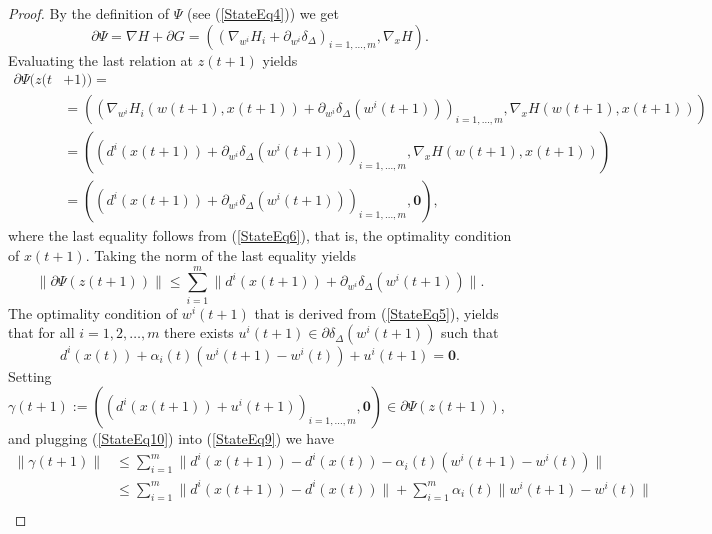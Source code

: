 \documentclass[11pt]{article}
\numberwithin{equation}{section}
\begin{document}
\begin{proof}
By the definition of $\Psi$ (see (\ref{StateEq4})) we get
\begin{equation*}
	\partial \Psi = \nabla H + \partial G  
= \left( \left( \nabla_{w^i} H_i + \partial_{w^i} \delta_{\Delta} \right)_{i=1, \ldots ,m} , \nabla_x H \right) .
\end{equation*}
Evaluating the last relation at $z(t+1)$ yields
\begin{equation*}
\begin{aligned}
	\partial \Psi(z(t & + 1)) = \\
	& = \left( \left( \nabla_{w^i} H_i(w(t+1),x(t+1)) + \partial_{w^i} \delta_{\Delta}(w^i(t+1)) \right)_{i=1, \ldots ,m} , \nabla_x H(w(t+1),x(t+1)) \right) \\
	& = \left( \left( d^i(x(t+1)) + \partial_{w^i} \delta_{\Delta}(w^i(t+1)) \right)_{i=1, \ldots ,m} , \nabla_x H(w(t+1),x(t+1)) \right) \\
	& = \left( \left( d^i(x(t+1)) + \partial_{w^i} \delta_{\Delta}(w^i(t+1)) \right)_{i=1, \ldots ,m} , \mathbf{0} \right) ,
\end{aligned}
\end{equation*}
where the last equality follows from (\ref{StateEq6}), that is, the optimality condition of $x(t+1)$. Taking the norm of the last equality yields
\begin{equation}
	\| \partial \Psi(z(t+1))\| 
	\leq \sum\limits_{i=1}^{m} \| d^i(x(t+1)) + \partial_{w^i} \delta_{\Delta}(w^i(t+1)) \|. \label{StateEq9}
\end{equation}
The optimality condition of $w^i(t+1)$ that is derived from (\ref{StateEq5}), yields that for all $i=1, 2, \ldots ,m$ there exists $u^i(t+1) \in \partial \delta_{\Delta}(w^i(t+1))$ such that
\begin{equation}
	d^i(x(t)) + \alpha_i(t) \left( w^i(t+1) - w^i(t) \right) + u^i(t+1) = \mathbf{0} . \label{StateEq10}
\end{equation}
Setting $\gamma(t+1) := \left( \left( d^i(x(t+1)) + u^i(t+1) \right)_{i=1, \ldots ,m}, \mathbf{0} \right) \in \partial \Psi(z(t+1))$, and plugging (\ref{StateEq10}) into (\ref{StateEq9}) we have
\begin{equation*}
\begin{aligned}
	\| \gamma(t+1) \|
	& \leq \sum\limits_{i=1}^{m} \| d^i(x(t+1)) - d^i(x(t)) - \alpha_i(t) \left( w^i(t+1) - w^i(t) \right) \| \\
	& \leq \sum\limits_{i=1}^{m} \| d^i(x(t+1)) - d^i(x(t)) \| + \sum\limits_{i=1}^{m} \alpha_i(t) \| w^i(t+1) - w^i(t) \| \\

\end{aligned}
\end{equation*}
\end{proof}
\end{document}
